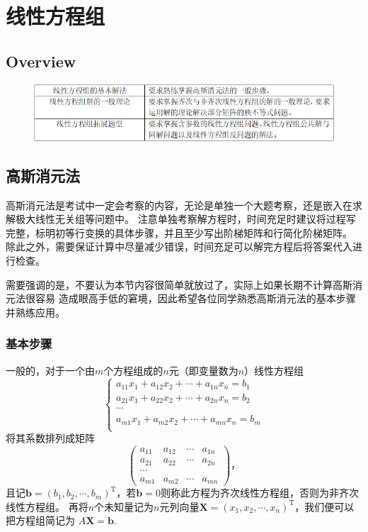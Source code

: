 \chapter{线性方程组}

\section{Overview}
\begin{figure}[h]
	\centering
	\includegraphics[scale=0.58]{8.png}
\end{figure}

\section{高斯消元法}
高斯消元法是考试中一定会考察的内容，无论是单独一个大题考察，还是嵌入在求解极大线性无关组等问题中。
注意单独考察解方程时，时间充足时建议将过程写完整，标明初等行变换的具体步骤，并且至少写出阶梯矩阵和行简化阶梯矩阵。
除此之外，需要保证计算中尽量减少错误，时间充足可以解完方程后将答案代入进行检查。

需要强调的是，不要认为本节内容很简单就放过了，实际上如果长期不计算高斯消元法很容易
造成眼高手低的窘境，因此希望各位同学熟悉高斯消元法的基本步骤并熟练应用。
\subsection{基本步骤}
一般的，对于一个由$m$个方程组成的$n$元（即变量数为$n$）线性方程组
$$\begin{cases}
	a_{11}x_1+a_{12}x_2+\cdots+a_{1n}x_n=b_1 \\
	a_{21}x_1+a_{22}x_2+\cdots+a_{2n}x_n=b_2 \\
	\cdots \\
	a_{m1}x_1+a_{m2}x_2+\cdots+a_{mn}x_n=b_m \\
\end{cases}$$
将其系数排列成矩阵
$$\begin{pmatrix}
	a_{11} & a_{12} & \cdots & a_{1n} \\
	a_{21} & a_{22} & \cdots & a_{2n} \\
	\cdots \\
	a_{m1} & a_{m2} & \cdots & a_{mn}
\end{pmatrix}，$$
且记$\bm{b}=(b_1,b_2,\cdots,b_m)^\mathrm{T}$，若$\bm{b}=0$则称此方程为齐次线性方程组，否则为非齐次线性方程组。
再将$n$个未知量记为$n$元列向量$\bm{X}=(x_1,x_2,\cdots,x_n)^\mathrm{T}$，我们便可以把方程组简记为
$A\bm{X}=\bm{b}$.

